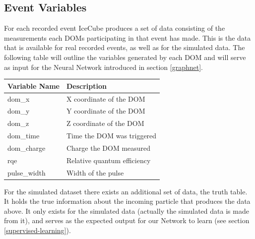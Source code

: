 \documentclass[a4paper,10pt]{scrartcl}
\begin{document}
\subsection{Event Variables}
\label{variables}

For each recorded event IceCube produces a set of data consisting of the measurements each DOMs participating in that event has made.
This is the data that is available for real recorded events, as well as for the simulated data.
The following table will outline the variables \cite{graphnet} generated by each DOM and will serve as input for the Neural Network introduced in section \ref{graphnet}.

\begin{center}
    \begin{tabular}{ |l|l| }
        \hline
        Variable Name & Description                 \\
        \hline
        dom\_x        & X coordinate of the DOM     \\
        dom\_y        & Y coordinate of the DOM     \\
        dom\_z        & Z coordinate of the DOM     \\
        dom\_time     & Time the DOM was triggered  \\
        dom\_charge   & Charge the DOM measured     \\
        rqe           & Relative quantum efficiency \\
        pulse\_width  & Width of the pulse          \\
        \hline
    \end{tabular}
\end{center}

For the simulated dataset there exists an additional set of data, the truth table.
It holds the true information about the incoming particle that produces the data above.
It only exists for the simulated data (actually the simulated data is made from it), and serves as the expected output for our Network to learn (see section \ref{supervised-learning}).
\end{document}
